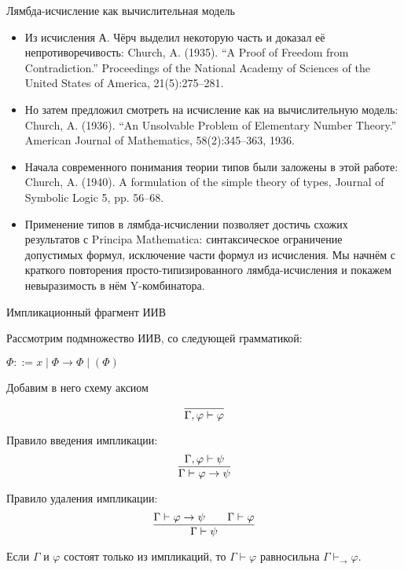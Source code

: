 \documentclass[aspectratio=169]{beamer}
\begin{document}
\begin{frame}{Лямбда-исчисление как вычислительная модель}
\begin{itemize}
\item Из исчисления А. Чёрч выделил некоторую часть и доказал её непротиворечивость:
Church, A. (1935). “A Proof of Freedom from Contradiction.” Proceedings of the National Academy of Sciences of the United States of America, 21(5):275–281.
\item Но затем предложил смотреть на исчисление как на вычислительную модель:
Church, A. (1936). “An Unsolvable Problem of Elementary Number Theory.” American Journal of Mathematics, 58(2):345–363, 1936.
\item Начала современного понимания теории типов были заложены в этой работе:
Church, A. (1940). A formulation of the simple theory of types, Journal of Symbolic Logic 5, pp. 56–68.
\item Применение типов в лямбда-исчислении позволяет достичь схожих результатов с Principa Mathematica: 
синтаксическое ограничение допустимых формул, исключение части формул из исчисления.
Мы начнём с краткого повторения просто-типизированного лямбда-исчисления и покажем невыразимость в нём Y-комбинатора.
\end{itemize}
\end{frame}

\begin{frame}{Импликационный фрагмент ИИВ}

Рассмотрим подмножество ИИВ, со следующей грамматикой:

$\Phi ::= x \; | \; \Phi \rightarrow \Phi \; | \; (\Phi)$

Добавим в него схему аксиом

$$\infer{\Gamma, \varphi \vdash \varphi}{}$$

	Правило введения импликации:
	\[
	\infer{\Gamma \vdash \varphi \to \psi}{\Gamma, \varphi \vdash \psi}
	\]

	Правило удаления импликации:
	\[
	\infer{\Gamma \vdash \psi}{\Gamma \vdash \varphi \to \psi && \Gamma \vdash \varphi}
	\]

\begin{theorem}	
	Если $\Gamma$ и $\varphi$ состоят только из импликаций, то $\Gamma \vdash \varphi$ равносильна $\Gamma \vdash_\rightarrow \varphi$.
\end{theorem}
\end{frame}
\end{document}
